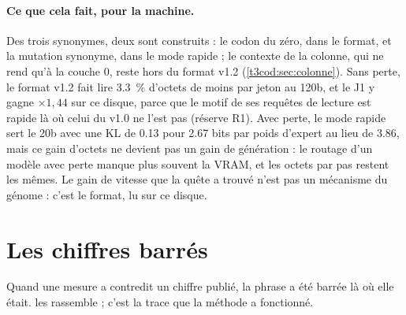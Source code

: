 \paragraph{Ce que cela fait, pour la machine.} Des trois synonymes, deux sont construits : le codon du zéro, dans le format, et la mutation synonyme, dans le mode rapide ; le contexte de la colonne, qui ne rend qu'à la couche 0, reste hors du format v1.2 (\cref{t3cod:sec:colonne}). Sans perte, le format v1.2 fait lire \SI{3.3}{\percent} d'octets de moins par jeton au 120b, et le J1 y gagne $\times 1{,}44$ sur ce disque, parce que le motif de ses requêtes de lecture est rapide là où celui du v1.0 ne l'est pas (réserve R1). Avec perte, le mode rapide sert le 20b avec une KL de \num{0.13} pour \num{2.67} bits par poids d'expert au lieu de \num{3.86}, mais ce gain d'octets ne devient pas un gain de génération : le routage d'un modèle avec perte manque plus souvent la VRAM, et les octets par pas restent les mêmes. Le gain de vitesse que la quête a trouvé n'est pas un mécanisme du génome : c'est le format, lu sur ce disque.

\section{Les chiffres barrés}\label{t3dis:sec:barres}

Quand une mesure a contredit un chiffre publié, la phrase a été barrée là où elle était.  les rassemble ; c'est la trace que la méthode a fonctionné.

